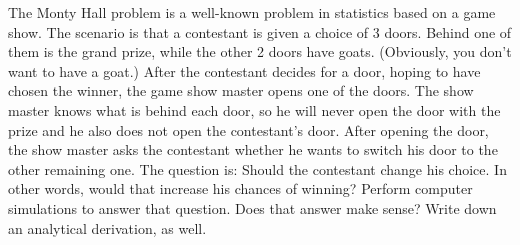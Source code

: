 \documentclass[10pt, physics]{homework}
\begin{document}
	\begin{problem}[12pts]
		The Monty Hall problem is a well-known problem in statistics based on a game show. The scenario is that a contestant is given a choice of 3 doors. Behind one of them is the grand prize, while the other 2 doors have goats. (Obviously, you don’t want to have a goat.) After the contestant decides for a door, hoping to have chosen the winner, the game show master opens one of the doors. The show master knows what is behind each door, so he will never open the door with the prize and he also does not open the contestant’s door. After opening the door, the show master asks the contestant whether he wants to switch his door to the other remaining one. The question is: Should the contestant change his choice. In other words, would that increase his chances of winning? Perform computer simulations to answer that question. Does that answer make sense? Write down an analytical derivation, as well.
	\end{problem}
\end{document}
